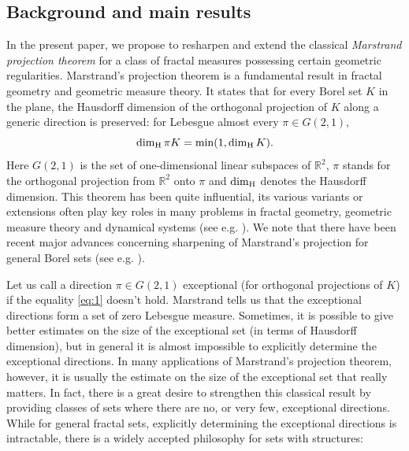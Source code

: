 \documentclass[a4paper,11pt]{amsart}
\theoremstyle{definition}
\numberwithin{equation}{section}
\def\R{\mathbb R}
\begin{document}
\subsection{Background and main results}
In the present paper,  we propose to resharpen and extend the classical  {\em Marstrand projection theorem} for a class of fractal measures possessing  certain geometric regularities.  Marstrand's projection theorem \cite{Marstrand1954} is a fundamental result in fractal geometry and geometric measure theory.  It states that for every Borel set $K$ in the plane,  the   Hausdorff dimension of the   orthogonal projection of  $K$ along a  generic direction  is preserved: for Lebesgue almost every $\pi\in G(2,1)$,
\begin{equation}\label{eq:1}
\dim_{\rm H} \pi  K = \min (1,\dim_{\rm H}K).
\end{equation}
Here $G(2,1)$ is the set of one-dimensional linear subspaces of $\R^2$,  $\pi $ stands for the orthogonal projection from $\mathbb{R}^2$ onto $\pi$  and $\dim_{\rm H}$ denotes the Hausdorff dimension.  This theorem has been quite influential,  its various variants or extensions often play key roles in many problems in fractal geometry,  geometric measure theory and dynamical systems (see e.g. \cite{FFJ,BHR,Shmerkin2015,HS2012,HS2015,BFLM}).   We note that there have been  recent major advances concerning sharpening of Marstrand's projection for general Borel sets (see e.g.  \cite{Orponen-Shmerkin-2023,Ren-Wang}). 

Let us call a direction $\pi\in G(2,1)$ exceptional  (for orthogonal projections of $K$)  if the equality  \eqref{eq:1} doesn't hold.  
Marstrand tells us that  the exceptional  directions form a set of zero Lebesgue measure.  Sometimes,  it is possible to give better estimates on the size of the exceptional set (in terms of Hausdorff dimension), but in general it is almost impossible to explicitly determine the exceptional directions.  In many applications of Marstrand's projection theorem,  however,  it is usually the estimate on the size of the exceptional set that really matters.   
In fact, there is a great desire to strengthen this classical result by providing classes of sets where there are no,  or very few,  exceptional directions.   While for general fractal sets,  explicitly determining the exceptional directions is intractable,  there is a widely accepted philosophy for sets with structures:
\end{document}
